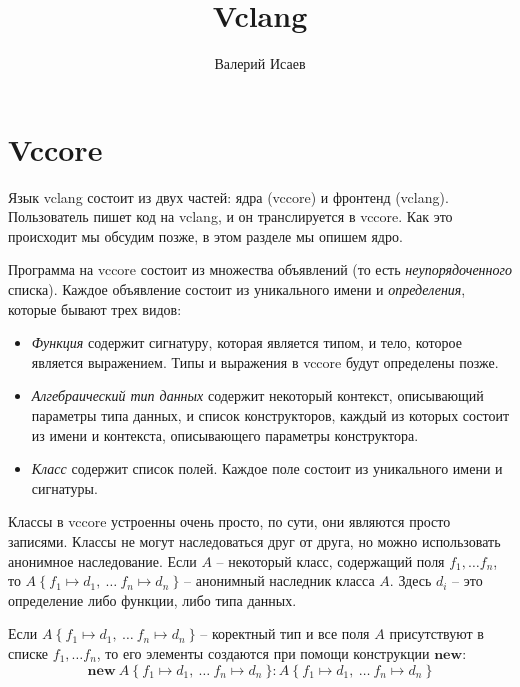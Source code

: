\documentclass{amsart}
\theoremstyle{definition}
\theoremstyle{remark}
\numberwithin{figure}{section}
\begin{document}
\title{Vclang}

\author{Валерий Исаев}


\maketitle

\section{Vccore}

Язык vclang состоит из двух частей: ядра (vccore) и фронтенд (vclang).
Пользователь пишет код на vclang, и он транслируется в vccore.
Как это происходит мы обсудим позже, в этом разделе мы опишем ядро.

Программа на vccore состоит из множества объявлений (то есть \emph{неупорядоченного} списка).
Каждое объявление состоит из уникального имени и \emph{определения}, которые бывают трех видов:
\begin{itemize}
\item \emph{Функция} содержит сигнатуру, которая является типом, и тело, которое является выражением. Типы и выражения в vccore будут определены позже.
\item \emph{Алгебраический тип данных} содержит некоторый контекст, описывающий параметры типа данных, и список конструкторов, каждый из которых состоит из имени и контекста, описывающего параметры конструктора.
\item \emph{Класс} содержит список полей. Каждое поле состоит из уникального имени и сигнатуры.
\end{itemize}
Классы в vccore устроенны очень просто, по сути, они являются просто записями.
Классы не могут наследоваться друг от друга, но можно использовать анонимное наследование.
Если $A$ -- некоторый класс, содержащий поля $f_1, \ldots f_n$, то $A\ \{\ f_1 \mapsto d_1,\ \ldots\ f_n \mapsto d_n\ \}$ -- анонимный наследник класса $A$.
Здесь $d_i$ -- это определение либо функции, либо типа данных.

Если $A\ \{\ f_1 \mapsto d_1,\ \ldots\ f_n \mapsto d_n\ \}$ -- коректный тип и все поля $A$ присутствуют в списке $f_1, \ldots f_n$, то его элементы создаются при помощи конструкции $\mathbf{new}$:
\[ \mathbf{new}\ A\ \{\ f_1 \mapsto d_1,\ \ldots\ f_n \mapsto d_n\ \} : A\ \{\ f_1 \mapsto d_1,\ \ldots\ f_n \mapsto d_n\ \} \]
\end{document}
